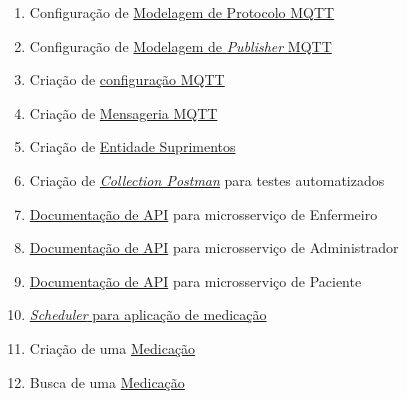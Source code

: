 \begin{apendicesenv}
\begin{enumerate}
    \item Configuração de \href{https://github.com/PillWatcher/pillwatcher-dpb-patient-service/blob/master/src/main/java/br/com/pillwatcher/dpb/config/Mqtt.java#L10}{Modelagem de Protocolo MQTT}
    \item Configuração de \href{https://github.com/PillWatcher/pillwatcher-dpb-patient-service/blob/master/src/main/java/br/com/pillwatcher/dpb/entities/MqttPublish.java#L11}{Modelagem de \textit{Publisher} MQTT}
    \item Criação de \href{https://github.com/PillWatcher/pillwatcher-dpb-patient-service/blob/master/src/main/java/br/com/pillwatcher/dpb/services/impl/MqttServiceImpl.java#L20}{configuração MQTT}
    \item Criação de \href{https://github.com/PillWatcher/pillwatcher-dpb-patient-service/blob/master/src/main/java/br/com/pillwatcher/dpb/services/impl/MqttServiceImpl.java#L34}{Mensageria MQTT}
    \item Criação de \href{https://github.com/PillWatcher/pillwatcher-dpb-patient-service/blob/054b23cdd47e24053d0c910e6ca881ce2af70788/src/main/java/br/com/pillwatcher/dpb/services/impl/SupplyServiceImpl.java#L27}{Entidade Suprimentos}
    \item Criação de \href{https://github.com/PillWatcher/postman-config/blob/master/Pillwatcher - DPB.postman_collection.json}{\textit{Collection Postman}} para testes automatizados
    \item \href{http://192.99.25.198:8080/swagger-ui.html}{Documentação de API} para microsserviço de Enfermeiro
    \item \href{http://192.99.25.198:8081/swagger-ui.html}{Documentação de API} para microsserviço de Administrador
    \item \href{http://192.99.25.198:8082/swagger-ui.html}{Documentação de API} para microsserviço de Paciente
    \item \href{https://github.com/PillWatcher/pillwatcher-dpb-patient-service/blob/3f23830e41a6db53709f8d627a36c7d189a91595/src/main/java/br/com/pillwatcher/dpb/services/impl/MedicationScheduledServiceImpl.java#L36}{\textit{Scheduler} para aplicação de medicação}
    \item Criação de uma \href{https://github.com/PillWatcher/pillwatcher-dpb-patient-service/blob/master/src/main/java/br/com/pillwatcher/dpb/services/impl/MedicationServiceImpl.java#L44}{Medicação}
    \item Busca de uma \href{https://github.com/PillWatcher/pillwatcher-dpb-patient-service/blob/master/src/main/java/br/com/pillwatcher/dpb/services/impl/MedicationServiceImpl.java#L66}{Medicação}

\end{enumerate}
\end{apendicesenv}
